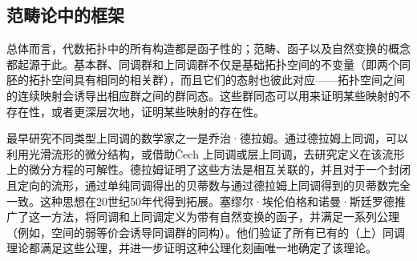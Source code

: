 \subsection{范畴论中的框架}
总体而言，代数拓扑中的所有构造都是函子性的；范畴、函子以及自然变换的概念都起源于此。基本群、同调群和上同调群不仅是基础拓扑空间的不变量（即两个同胚的拓扑空间具有相同的相关群），而且它们的态射也彼此对应——拓扑空间之间的连续映射会诱导出相应群之间的群同态。这些群同态可以用来证明某些映射的不存在性，或者更深层次地，证明某些映射的存在性。

最早研究不同类型上同调的数学家之一是乔治·德拉姆。通过德拉姆上同调，可以利用光滑流形的微分结构，或借助Čech 上同调或层上同调，去研究定义在该流形上的微分方程的可解性。德拉姆证明了这些方法是相互关联的，并且对于一个封闭且定向的流形，通过单纯同调得出的贝蒂数与通过德拉姆上同调得到的贝蒂数完全一致。这种思想在20世纪50年代得到拓展。塞缪尔·埃伦伯格和诺曼·斯廷罗德推广了这一方法，将同调和上同调定义为带有自然变换的函子，并满足一系列公理（例如，空间的弱等价会诱导同调群的同构）。他们验证了所有已有的（上）同调理论都满足这些公理，并进一步证明这种公理化刻画唯一地确定了该理论。
